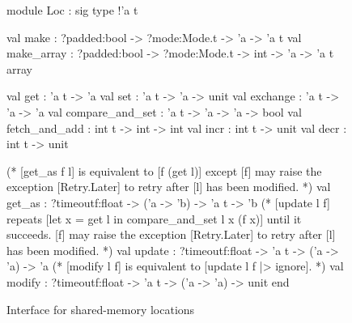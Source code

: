 \begin{figure}
\begin{ocamlcode}
module Loc : sig
  type !'a t
  
  val make : ?padded:bool -> ?mode:Mode.t -> 'a -> 'a t
  val make_array : ?padded:bool -> ?mode:Mode.t -> int -> 'a -> 'a t array
  
  val get : 'a t -> 'a
  val set : 'a t -> 'a -> unit
  val exchange : 'a t -> 'a -> 'a
  val compare_and_set : 'a t -> 'a -> 'a -> bool
  val fetch_and_add : int t -> int -> int
  val incr : int t -> unit
  val decr : int t -> unit
  
  (* [get_as f l] is equivalent to [f (get l)] except [f] may raise the
     exception [Retry.Later] to retry after [l] has been modified. *)
  val get_as : ?timeoutf:float -> ('a -> 'b) -> 'a t -> 'b
  (* [update l f] repeats [let x = get l in compare_and_set l x (f x)] until it
     succeeds. [f] may raise the exception [Retry.Later] to retry after [l] has
     been modified. *)
  val update : ?timeoutf:float -> 'a t -> ('a -> 'a) -> 'a
  (* [modify l f] is equivalent to [update l f |> ignore]. *)
  val modify : ?timeoutf:float -> 'a t -> ('a -> 'a) -> unit
end
\end{ocamlcode}
\caption{Interface for shared-memory locations}
\label{fig:loc_interface}
\end{figure}